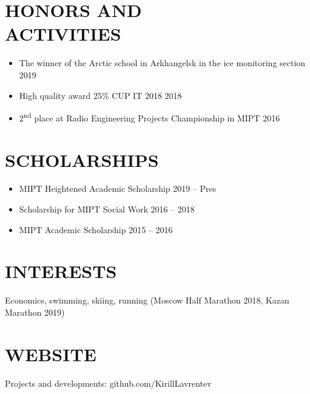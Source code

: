 \documentclass[margin, 10pt]{res} %
\begin{document}
\begin{resume}
\section{HONORS AND\\ ACTIVITIES}
\begin{itemize}
\item The winner of the Arctic school in Arkhangelsk in the ice monitoring section \hfill 2019
\item High quality award 25\% CUP IT 2018 \hfill 2018
\item 2\textsuperscript{nd} place at Radio Engineering Projects Championship in MIPT \hfill 2016
\end{itemize} 


\section{SCHOLARSHIPS} 
\begin{itemize}
\item MIPT Heightened Academic Scholarship \hfill 2019 -- Pres
\item Scholarship for MIPT Social Work \hfill 2016 -- 2018
\item MIPT Academic Scholarship \hfill 2015 -- 2016
\end{itemize} 



\section{INTERESTS}
Economics, swimming, skiing, running (Moscow Half Marathon 2018, Kazan Marathon 2019)
\section{WEBSITE}
Projects and developments: github.com/KirillLavrentev


\end{resume}
\end{document}
